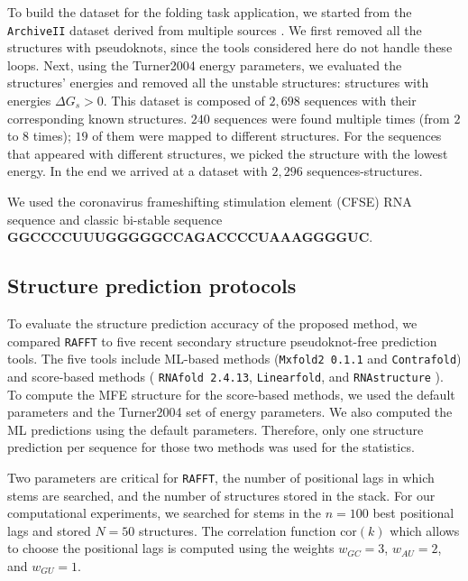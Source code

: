 To build the dataset for the folding task application, we started from the \texttt{ArchiveII} dataset derived from multiple sources \cite{andronescu08_rna_stran,brown98_ribon_p_datab,bellaousov10_probk,daub08_rna_wikip,damberger94_compar_datab_group_i_intron_struc,zwieb00_tmrdb,zwieb03_tmrdb,waring84_asses_model_intron_rna_secon,specht97_compil_rrna_rrna_gene_sequen,sprinzl98_compil_trna_sequen_sequen_trna_genes,sloma16_exact_calcul_loop_format_probab,schnare96_compr_compar_struc_charac_eukar,mathews99_expan_sequen_depen_therm_param,samuelsson99_signal_recog_partic_datab_srpdb,gutell93_compil_large_subun_like_ribos_rna_struc,gutell94_collec_small_subun_like_ribos_rna_struc,gardner09_rfam}. We first removed all the structures with pseudoknots, since the tools considered here do not handle these loops. Next, using the Turner2004 energy parameters, we evaluated the structures' energies and removed all the unstable structures: structures with energies $\Delta G_s > 0$. This dataset is composed of $2,698$ sequences with their corresponding known structures. $240$ sequences were found multiple times (from $2$ to $8$ times); $19$ of them were mapped to different structures. For the sequences that appeared with different structures, we picked the structure with the lowest energy. In the end we arrived at a dataset with $2,296$ sequences-structures.

We used the coronavirus frameshifting stimulation element (CFSE) RNA sequence and classic bi-stable sequence \textbf{GGCCCCUUUGGGGGCCAGACCCCUAAAGGGGUC}.

\subsection{Structure prediction protocols}

To evaluate the structure prediction accuracy of the proposed method, we compared \texttt{RAFFT} to five recent secondary structure pseudoknot-free prediction tools. The five tools include ML-based methods (\texttt{Mxfold2 0.1.1} and \texttt{Contrafold}) and score-based methods ( \texttt{RNAfold 2.4.13},  \texttt{Linearfold},  and \texttt{RNAstructure} ). To compute the MFE structure for the score-based methods, we used the default parameters and the Turner2004 set of energy parameters. We also computed the ML predictions using the default parameters. Therefore, only one structure prediction per sequence for those two methods was used for the statistics.

Two parameters are critical for \texttt{RAFFT}, the number of positional lags in which stems are searched, and the number of structures stored in the stack. For our computational experiments, we searched for stems in the $n=100$ best positional lags and stored $N=50$ structures. The correlation function \(\text{cor}(k)\) which allows to choose the positional lags is computed using the weights \(w_{GC}=3\), \(w_{AU}=2\), and \(w_{GU}=1\).

